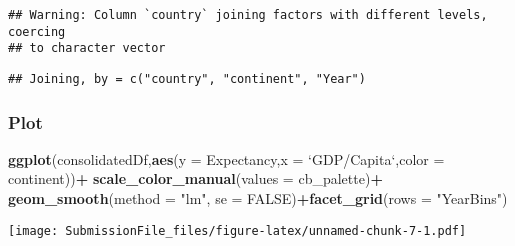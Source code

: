 \documentclass[]{article}
\newenvironment{Shaded}{\begin{snugshade}}{\end{snugshade}}
\newcommand{\DataTypeTok}[1]{\textcolor[rgb]{0.13,0.29,0.53}{#1}}
\newcommand{\DecValTok}[1]{\textcolor[rgb]{0.00,0.00,0.81}{#1}}
\newcommand{\KeywordTok}[1]{\textcolor[rgb]{0.13,0.29,0.53}{\textbf{#1}}}
\newcommand{\NormalTok}[1]{#1}
\newcommand{\OperatorTok}[1]{\textcolor[rgb]{0.81,0.36,0.00}{\textbf{#1}}}
\newcommand{\OtherTok}[1]{\textcolor[rgb]{0.56,0.35,0.01}{#1}}
\newcommand{\StringTok}[1]{\textcolor[rgb]{0.31,0.60,0.02}{#1}}
\begin{document}
\begin{verbatim}
## Warning: Column `country` joining factors with different levels, coercing
## to character vector
\end{verbatim}

\begin{Shaded}
\end{Shaded}

\begin{verbatim}
## Joining, by = c("country", "continent", "Year")
\end{verbatim}

\begin{Shaded}
\end{Shaded}

\hypertarget{plot-1}{%
\subsubsection{Plot}\label{plot-1}}

\begin{Shaded}
\begin{Highlighting}[]
\KeywordTok{ggplot}\NormalTok{(consolidatedDf,}\KeywordTok{aes}\NormalTok{(}\DataTypeTok{y =}\NormalTok{ Expectancy,}\DataTypeTok{x =} \StringTok{`}\DataTypeTok{GDP/Capita}\StringTok{`}\NormalTok{,}\DataTypeTok{color =}\NormalTok{ continent))}\OperatorTok{+}
\StringTok{  }\KeywordTok{scale_color_manual}\NormalTok{(}\DataTypeTok{values =}\NormalTok{ cb_palette)}\OperatorTok{+}
\StringTok{  }\KeywordTok{geom_smooth}\NormalTok{(}\DataTypeTok{method =} \StringTok{"lm"}\NormalTok{, }\DataTypeTok{se =} \OtherTok{FALSE}\NormalTok{)}\OperatorTok{+}\KeywordTok{facet_grid}\NormalTok{(}\DataTypeTok{rows =} \StringTok{"YearBins"}\NormalTok{)}
\end{Highlighting}
\end{Shaded}

\texttt{[image: SubmissionFile\_files/figure-latex/unnamed-chunk-7-1.pdf]}
\end{document}
